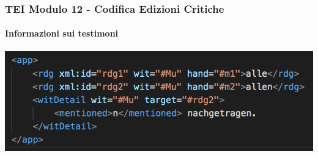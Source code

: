 \begin{frame}
    \frametitle{TEI Modulo 12 - Codifica Edizioni Critiche}
    \framesubtitle{Informazioni sui testimoni}
    \addtocounter{nframe}{1}
    






    
    \begin{center}
        \includegraphics[width=.95\textwidth]{imgs/witDetails.png}
    \end{center}



\end{frame}






